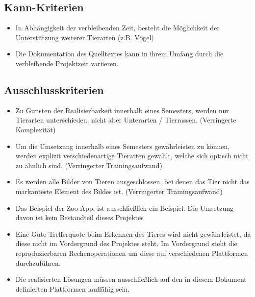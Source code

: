 \vspace{0.8cm}


\subsection{Kann-Kriterien}

\vspace{0.5cm}

\begin{itemize}
	\item In Abhängigkeit der verbleibenden Zeit, besteht die Möglichkeit der Unterstützung weiterer Tierarten (z.B. Vögel)
	\item Die Dokumentation des Quelltextes kann in ihrem Umfang durch die verbleibende Projektzeit variieren.
\end{itemize}

\vspace{0.8cm}


\subsection{Ausschlusskriterien}

\vspace{0.5cm}

\begin{itemize}
	\item Zu Gunsten der Realisierbarkeit innerhalb eines Semesters, werden nur Tierarten unterschieden, nicht aber Unterarten / Tierrassen. (Verringerte Komplexität)
	\item Um die Umsetzung innerhalb eines Semesters gewährleisten zu können, werden explizit verschiedenartige Tierarten gewählt, welche sich optisch nicht zu ähnlich sind. (Verringerter Trainingsaufwand)
	\item Es werden alle Bilder von Tieren ausgeschlossen, bei denen das Tier nicht das markanteste Element des Bildes ist. (Verringerter Trainingsaufwand)
	\item Das Beispiel der Zoo App, ist ausschließlich ein Beispiel. Die Umsetzung davon ist kein Bestandteil dieses Projektes
	\item Eine Gute Trefferquote beim Erkennen des Tieres wird nicht gewährleistet, da diese nicht im Vordergrund des Projektes steht. Im Vordergrund steht die reproduzierbaren Rechenoperationen um diese auf verschiedenen Plattformen durchzuführen.
	\item Die realisierten Lösungen müssen ausschließlich auf den in diesem Dokument definierten Plattformen lauffähig sein. 
\end{itemize}

